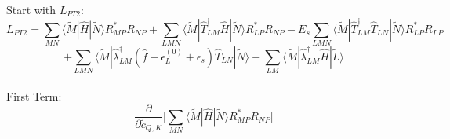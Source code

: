 \documentclass[12pt]{article}
\begin{document}
Start with $L_{PT2}$:
\begin{equation*}
L_{PT2}=\sum_{MN}\langle \tilde{M}|\hat{H}|\tilde{N}\rangle R_{MP}^{*}R_{NP}
+\sum_{LMN}\langle\tilde{M}|\hat{T}_{LM}^{\dagger}\hat{H}|\tilde{N}\rangle R^{*}_{LP}R_{NP}
-E_{s}\sum_{LMN}\langle\tilde{M}|\hat{T}_{LM}^{\dagger}\hat{T}_{LN}|\tilde{N}\rangle R^{*}_{LP}R_{LP}
\end{equation*}
\begin{equation}
+\sum_{LMN}\langle\tilde{M}|\hat{\lambda}_{LM}^{\dagger}(\hat{f}-\epsilon_{L}^{(0)}+\epsilon_{s})\hat{T}_{LN}|\tilde{N}\rangle
+\sum_{LM}\langle\tilde{M}|\hat{\lambda}_{LM}^{\dagger}\hat{H}|\tilde{L}\rangle 
\end{equation}
\\
First Term:
\begin{equation*}
 \frac{\partial}{\partial \tilde{c}_{Q,K}}\Bigg[ \sum_{MN}\langle \tilde{M}|\hat{H}|\tilde{N}\rangle R_{MP}^{*}R_{NP}\Bigg]
\end{equation*}
\end{document}

